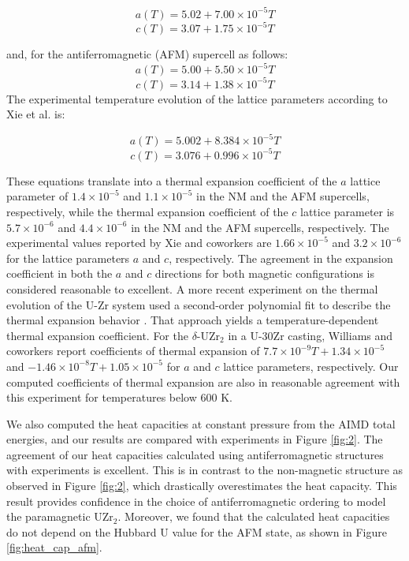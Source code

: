 \documentclass[preprint,12pt]{elsarticle}
\begin{document}
\[
 a(T) = 5.02 + 7.00 \times 10^{-5} T \]
 \[
 c(T) = 3.07 + 1.75 \times 10^{-5} T \]

\noindent and, for the antiferromagnetic (AFM) supercell as follows:
\[
 a(T) = 5.00 + 5.50 \times 10^{-5} T \]
 \[
 c(T) = 3.14 + 1.38 \times 10^{-5} T \]
 The experimental temperature evolution of the lattice parameters according to Xie et al. \cite{xie_phase_2022} is:

 \[
 a(T) = 5.002 + 8.384 \times 10^{-5} T \]
 \[
 c(T) = 3.076 + 0.996 \times 10^{-5} T \]

These equations translate into a thermal expansion coefficient of the $a$ lattice parameter of $1.4 \times 10^{-5}$ and $1.1 \times 10^{-5}$ in the NM and the AFM supercells, respectively, while the thermal expansion coefficient of the $c$ lattice parameter is $5.7 \times 10^{-6}$ and $4.4 \times 10^{-6}$ in the NM and the AFM supercells, respectively. The experimental values reported by Xie and coworkers are $1.66 \times 10^{-5}$   and  $3.2 \times 10^{-6}$  for the lattice parameters $a$ and $c$, respectively. The agreement in the expansion coefficient in both the $a$ and $c$ directions for both magnetic configurations is considered reasonable to excellent. A more recent experiment on the thermal evolution of the U-Zr system used a second-order polynomial fit to describe the thermal expansion behavior \cite{williams_phase_2023}. That approach yields a temperature-dependent thermal expansion coefficient. For the $\delta$-UZr$_2$ in a U-30Zr casting, Williams and coworkers \cite{williams_phase_2023} report coefficients of thermal expansion of $7.7 \times 10^{-9} T + 1.34 \times 10^{-5}$ and $-1.46 \times 10^{-8} T + 1.05 \times 10^{-5}$ for $a$ and $c$  lattice parameters, respectively. Our computed coefficients of thermal expansion are also in reasonable agreement with this experiment for temperatures below 600 K. 


We also computed the heat capacities at constant pressure from the AIMD total energies, and our results are compared with experiments \cite{takahashi_heat_1989, ding_magnetic_2021} in Figure \ref{fig:2}. The agreement of our heat capacities calculated using antiferromagnetic structures with experiments \cite{takahashi_heat_1989} is excellent. This is in contrast to the non-magnetic structure as observed in Figure \ref{fig:2}, which drastically overestimates the heat capacity. This result provides confidence in the choice of antiferromagnetic ordering to model the paramagnetic UZr$_2$. Moreover, we found that the calculated heat capacities do not depend on the Hubbard U value for the AFM state, as shown in Figure \ref{fig:heat_cap_afm}. 
\end{document}
